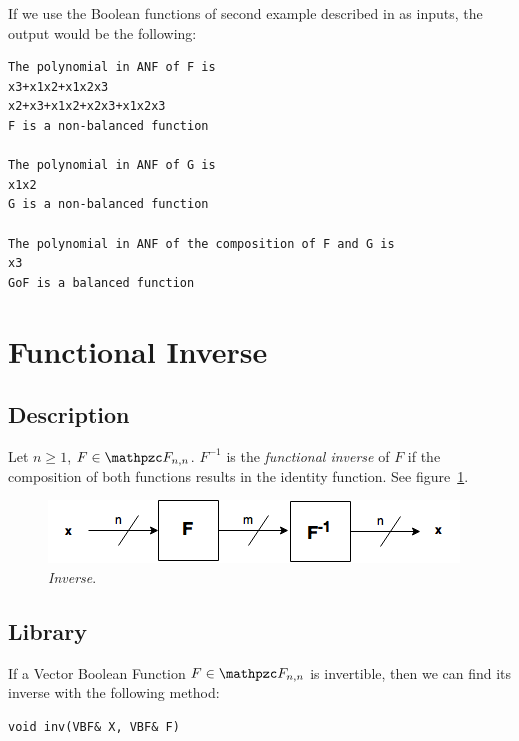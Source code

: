 \begin{example}
If we use the Boolean functions of second example described in \cite{GuptaS:05} as inputs, the output would be the following:

\begin{verbatim}
The polynomial in ANF of F is
x3+x1x2+x1x2x3
x2+x3+x1x2+x2x3+x1x2x3
F is a non-balanced function

The polynomial in ANF of G is
x1x2
G is a non-balanced function

The polynomial in ANF of the composition of F and G is
x3
GoF is a balanced function
\end{verbatim}

\end{example}

\section{Functional Inverse}

\subsection{Description}

\begin{definition}
Let $n \geq 1$, $F \in \funct{F}_{n,n}$. $F^{-1}$ is the \textit{functional inverse} of $F$ if the composition of both functions results in the identity function. See figure~\ref{fig:Inverse}.
\end{definition}

\begin{figure}[htbp!]
\centering
\includegraphics{Inverse}
\caption[Inverse]{\textit{Inverse}.}
\label{fig:Inverse}
\end{figure}

\subsection{Library}

If a Vector Boolean Function $F \in \funct{F}_{n,n}$ is invertible, then we can find its inverse with the following method:

\begin{verbatim}
void inv(VBF& X, VBF& F)
\end{verbatim}

